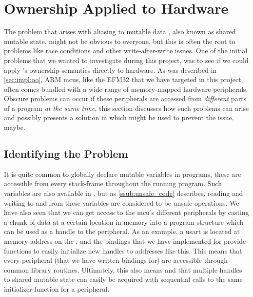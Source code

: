 
\section{Ownership Applied to Hardware}
\label{sec:ownership_allied_to_hardware}

The problem that arises with aliasing to mutable data \cite{web:problem_with_shared_mutability}, also known as shared mutable state, might not be obvious to everyone, but this is often the root to problems like race conditions and other write-after-write issues.
One of the initial problems that we wanted to investigate during this project, was to see if we could apply {\rust}'s ownership-semantics directly to hardware.
As was described in \autoref{sec:impl:oo}, ARM \glspl{mcu}, like the EFM32 that we have targeted in this project, often comes bundled with a wide range of memory-mapped hardware peripherals.
Obscure problems can occur if these peripherals are accessed from \emph{different} parts of a program \emph{at the same time}, this section discusses how such problems can arise and possibly presents a solution in which {\rust} might be used to prevent the issue, maybe.

\subsection{Identifying the Problem}

It is quite common to globally declare mutable variables in {\C} programs, these are accessible from every stack-frame throughout the running program.
Such variables are also available in {\rust}, but as \autoref{ssub:unsafe_code} describes, reading and writing to and from these variables are considered to be unsafe operations.
We have also seen that we can get access to the \gls{mcu}'s different peripherals by casting a chunk of data at a certain location in memory into a program structure which can be used as a handle to the peripheral.
As an example, a \gls{usart} is located at memory address  on the {\gecko}, and the bindings that we have implemented for {\emlib} provide functions to easily initialize new handles to addresses like this.
This means that every peripheral (that we have written bindings for) are accessible through common library routines.
Ultimately, this also means and that multiple handles to shared mutable state can easily be acquired with sequential calls to the same initializer-function for a peripheral.

